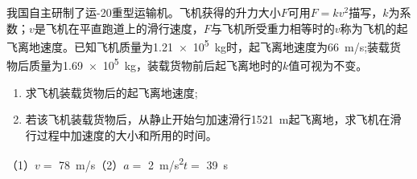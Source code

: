 我国自主研制了运-20重型运输机。飞机获得的升力大小\(F\)可用\(F=kv^2\)描写，\(k\)为系数；\(v\)是飞机在平直跑道上的滑行速度，\(F\)与飞机所受重力相等时的\(v\)称为飞机的起飞离地速度。已知飞机质量为\qty{1.21e5}{kg}时，起飞离地速度为\qty{66}{m/s};装载货物后质量为\qty{1.69e5}{kg}，装载货物前后起飞离地时的\(k\)值可视为不变。
\begin{enumerate}
	\item 求飞机装载货物后的起飞离地速度;
	\item 若该飞机装载货物后，从静止开始匀加速滑行\qty{1521}{m}起飞离地，求飞机在滑行过程中加速度的大小和所用的时间。
\end{enumerate}
\begin{answer}
	（1）\(v =\) \qty{78}{m/s}（2）\(a =\) \qty{2}{m/s^2}\quad \(t =\) \qty{39}{s}
\end{answer}